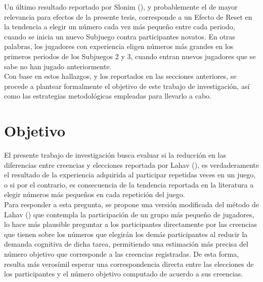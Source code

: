 Un último resultado reportado por Slonim (\citeyear{Slonim}), y probablemente el de mayor relevancia para efectos de la presente tesis, corresponde a un Efecto de Reset en la tendencia a elegir un número cada vez más pequeño entre cada periodo, cuando se inicia un nuevo Subjuego contra participantes novatos. En otras palabras, los jugadores con experiencia eligen números más grandes en los primeros periodos de los Subjuegos 2 y 3, cuando entran nuevos jugadores que se sabe no han jugado anteriormente.\\

Con base en estos hallazgos, y los reportados en las secciones anteriores, se procede a plantear formalmente el objetivo de este trabajo de investigación, así como las estrategias metodológicas empleadas para llevarlo a cabo. \\

\section{Objetivo}

El presente trabajo de investigación busca evaluar si la reducción en las diferencias entre creencias y elecciones reportada por Lahav (\citeyear{Lahav}), es verdaderamente el resultado de la experiencia adquirida al participar repetidas veces en un juego, o si por el contrario, es consecuencia de la tendencia reportada en la literatura a elegir números más pequeños en cada repetición del juego.\\

Para responder a esta pregunta, se propone una versión modificada del método de Lahav (\citeyear{Lahav}) que contempla la participación de un grupo más pequeño de jugadores, lo hace más plausible preguntar a los participantes directamente por las creencias que tienen sobre los números que elegirán los demás participantes al reducir la demanda cognitiva de dicha tarea, permitiendo una estimación más precisa del número objetivo que corresponde a las creencias registradas. De esta forma, resulta más verosímil esperar una correspondencia directa entre las elecciones de los participantes y el número objetivo computado de acuerdo a sus creencias.\\

